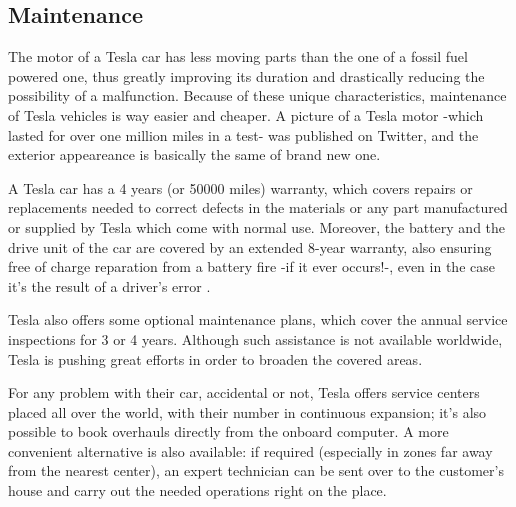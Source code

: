 \subsection{Maintenance}

The motor of a Tesla car has less moving parts than the one of a fossil fuel powered one, thus greatly improving its duration and drastically reducing the possibility of a malfunction. Because of these unique characteristics, maintenance of Tesla vehicles is way easier and cheaper. A picture of a Tesla motor -which lasted for over one million miles in a test- was published on Twitter, and the exterior appeareance is basically the same of brand new one\cite{tesla1mMiles}.

A Tesla car has a 4 years (or 50000 miles) warranty, which covers repairs or replacements needed to correct defects in the materials or any part manufactured or supplied by Tesla which come with normal use. Moreover, the battery and the drive unit of the car are covered by an extended 8-year warranty, also ensuring free of charge reparation from a battery fire -if it ever occurs!-, even in the case it's the result of a driver's error \cite{teslaWarranty}. 

Tesla also offers some optional maintenance plans, which cover the annual service inspections for 3 or 4 years. Although such assistance is not available worldwide, Tesla is pushing great efforts in order to broaden the covered areas. 

For any problem with their car, accidental or not, Tesla offers service centers placed all over the world, with their number in continuous expansion; it's also possible to book overhauls directly from the onboard computer. A more convenient alternative is also available: if required (especially in zones far away from the nearest center), an expert technician can be sent over to the customer's house and carry out the needed operations right on the place.